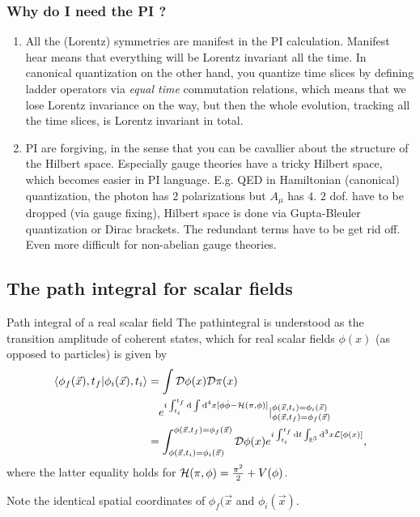 \subsubsection{Why do I need the PI ?}
\begin{enumerate}
	\item All the (Lorentz) symmetries are manifest in the PI calculation. Manifest hear means that everything will be Lorentz invariant all the time. In canonical quantization on the other hand, you quantize time slices by defining ladder operators via \emph{equal time} commutation relations, which means that we lose Lorentz invariance on the way, but then the whole evolution, tracking all the time slices, is Lorentz invariant in total.
	\item PI are forgiving, in the sense that you can be cavallier about the structure of the Hilbert space. Especially gauge theories have a tricky Hilbert space, which becomes easier in PI language. E.g. QED in Hamiltonian (canonical) quantization, the photon has $2$ polarizations but $A_\mu$ has $4$. $2$ dof. have to be dropped (via gauge fixing), Hilbert space is done via Gupta-Bleuler quantization or Dirac brackets. The redundant terms have to be get rid off. Even more difficult for non-abelian gauge theories.
\end{enumerate}


 

\subsection{The path integral for scalar fields}
\begin{mybox}{Path integral of a real scalar field}
	The pathintegral is understood as the transition amplitude of coherent states, which for real scalar fields $\phi(x)$ (as opposed to particles) is given by
\begin{align}
	\braket{\phi_f(\vec{x} ),t_f }{\phi_i(\vec{x}),t_i} &= \int \mathcal{D}\phi(x) \mathcal{D}\pi(x) \\
	&\quad e^{i \int_{t_i}^{t_f} \mathrm{d} \int \mathrm{d}^4 x [\phi \dot{\phi}-\mathcal{H}(\pi,\phi)]} |^{\phi(\vec{x},t_i)=\phi_i(\vec{x})}_{\phi(\vec{x},t_f)=\phi_f(\vec{x})}\nonumber \\
	&= \int_{\phi(\vec{x},t_i) = \phi_i(\vec{x})}^{\phi(\vec{x},t_f)=\phi_f(\vec{x})} \mathcal{D}\phi(x) e^{i \int_{t_i}^{t_f} \mathrm{d} t \int_{\mathbb{R}^3} \mathrm{d}^3 x \mathcal{L}[\phi(x)]},
\end{align}
where the latter equality holds for $\mathcal{H}(\pi,\phi)=\frac{\pi^2}{2}+V(\phi)$.
\end{mybox}
Note the identical spatial coordinates of $\phi_f(\vec{x}$ and $\phi_i(\vec{x})$.

